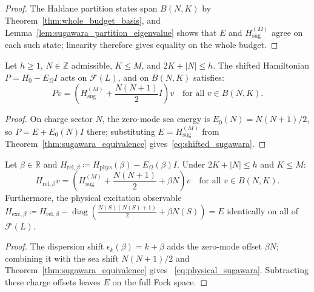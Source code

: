 \begin{proof}
The Haldane partition states span $B(N,K)$ by
Theorem~\ref{thm:whole_budget_basis}, and Lemma~\ref{lem:sugawara_partition_eigenvalue}
shows that $E$ and $H_{\mathrm{sug}}^{(M)}$ agree on each such state;
linearity therefore gives equality on the whole budget.
\end{proof}

\begin{theorem}
\label{thm:sugawara_relative_hamiltonian}
Let $h \ge 1$, $N \in \mathbb{Z}$ admissible, $K \le M$, and $2K + |N| \le h$. The shifted Hamiltonian $P=H_0-E_\Omega I$ acts on $\mathcal{F}(L)$, and on $B(N,K)$ satisfies:
\begin{equation}
\label{eq:shifted_sugawara}
P v = \left( H_{\mathrm{sug}}^{(M)} + \frac{N(N+1)}{2} I \right) v \quad \text{for all } v \in B(N, K).
\end{equation}
\end{theorem}

\begin{proof}
On charge sector $N$, the zero-mode sea energy is $E_0(N)=N(N+1)/2$,
so $P=E+E_0(N)I$ there; substituting
$E=H_{\mathrm{sug}}^{(M)}$ from Theorem~\ref{thm:sugawara_equivalence}
gives~\eqref{eq:shifted_sugawara}.
\end{proof}

\begin{theorem}
\label{thm:physical_sugawara_budget}
Let $\beta \in \mathbb{R}$ and $H_{\mathrm{rel}, \beta} \coloneqq H_{\mathrm{phys}}(\beta) - E_{\Omega}(\beta) I$. Under $2K + |N| \le h$ and $K \le M$:
\begin{equation}
\label{eq:physical_sugawara}
H_{\mathrm{rel}, \beta} v = \left( H_{\mathrm{sug}}^{(M)} + \frac{N(N+1)}{2} + \beta N \right) v \quad \text{for all } v \in B(N, K).
\end{equation}
Furthermore, the physical excitation observable $H_{\mathrm{exc}, \beta} \coloneqq H_{\mathrm{rel}, \beta} - \operatorname{diag}\left( \frac{N(S)(N(S)+1)}{2} + \beta N(S) \right) = E$ identically on all of $\mathcal{F}(L)$.
\end{theorem}

\begin{proof}
The dispersion shift $\epsilon_k(\beta)=k+\beta$ adds the zero-mode
offset $\beta N$; combining it with the sea shift
$N(N+1)/2$ and Theorem~\ref{thm:sugawara_equivalence} gives
~\eqref{eq:physical_sugawara}. Subtracting these charge offsets leaves
$E$ on the full Fock space.
\end{proof}

